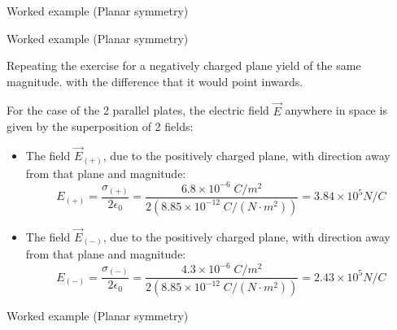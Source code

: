 {\begin{frame}{Worked example (Planar symmetry)}
\end{frame}

%
%
%

\begin{frame}{Worked example (Planar symmetry)}

Repeating the exercise for a negatively charged plane yield of the same magnitude.
with the difference that it would point inwards.\\
\vspace{0.2cm}

For the case of the 2 parallel plates, the electric field $\vec{E}$ anywhere in
space is given by the superposition of 2 fields:\\
\vspace{0.2cm}
\begin{itemize}
  \item The field $\vec{E}_{(+)}$, due to the positively charged plane, with direction
        away from that plane and magnitude:
        \begin{equation*}
            E_{(+)} =
              \frac{\sigma_{(+)}}{2\epsilon_0} =
              \frac{6.8 \times 10^{-6} \; C/m^2}{2(8.85 \times 10^{-12} \; C/(N \cdot m^2))} =
              3.84 \times 10^{5} N/C
        \end{equation*}
  \item The field $\vec{E}_{(-)}$, due to the positively charged plane, with direction
        away from that plane and magnitude:
        \begin{equation*}
            E_{(-)} =
              \frac{\sigma_{(-)}}{2\epsilon_0} =
              \frac{4.3 \times 10^{-6} \; C/m^2}{2(8.85 \times 10^{-12} \; C/(N \cdot m^2))} =
              2.43 \times 10^{5} N/C
        \end{equation*}
\end{itemize}

\end{frame}

%
%
%

\begin{frame}{Worked example (Planar symmetry)}


\end{frame}}
